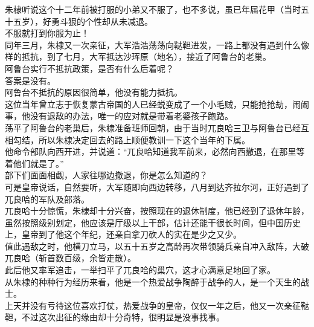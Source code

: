\begin{multicols}{\theparacolNo}
朱棣听说这个十二年前被打服的小弟又不服了，也不多说，虽已年届花甲（当时五十五岁），好勇斗狠的个性却从未减退。\\

不服就打到你服为止！\\

同年三月，朱棣又一次亲征，大军浩浩荡荡向鞑靼进发，一路上都没有遇到什么像样的抵抗，到了七月，大军抵达沙珲原（地名），接近了阿鲁台的老巢。\\

阿鲁台实行不抵抗政策，是否有什么后着呢？\\

答案是没有。\\

阿鲁台不抵抗的原因很简单，他没有能力抵抗。\\

这位当年曾立志于恢复蒙古帝国的人已经蜕变成了一个小毛贼，只能抢抢劫，闹闹事，他没有退敌的办法，唯一的应对就是带着老婆孩子跑路。\\

荡平了阿鲁台的老巢后，朱棣准备班师回朝，由于当时兀良哈三卫与阿鲁台已经互相勾结，所以朱棣决定回去的路上顺便教训一下这个当年的下属。\\

他命令部队向西开进，并说道：“兀良哈知道我军前来，必然向西撤退，在那里等着他们就是了。”\\

部下们面面相觑，人家往哪边撤退，你是怎么知道的？\\

可是皇帝说话，自然要听，大军随即向西边转移，八月到达齐拉尔河，正好遇到了兀良哈的军队及部落。\\

兀良哈十分惊慌，朱棣却十分兴奋，按照现在的退休制度，他已经到了退休年龄，虽然按照级别划定，他应该是厅级以上干部，估计还能干很长时间，但中国历史上，皇帝到了他这个年纪，还亲自拿刀砍人的实在是少之又少。\\

值此遇敌之时，他横刀立马，以五十五岁之高龄再次带领骑兵亲自冲入敌阵，大破兀良哈（斩首数百级，余皆走散）。\\

此后他又率军追击，一举扫平了兀良哈的巢穴，这才心满意足地回了家。\\

从朱棣的种种行为经历来看，他是一个热爱战争陶醉于战争的人，是一个天生的战士。\\

上天并没有亏待这位喜欢打仗，热爱战争的皇帝，仅仅一年之后，他又一次亲征鞑靼，不过这次出征的缘由却十分奇特，很明显是没事找事。\\


\end{multicols}
